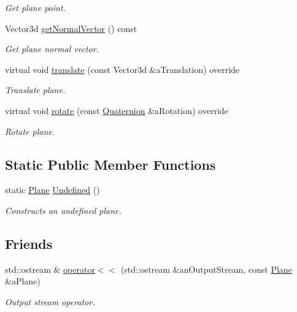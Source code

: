 \begin{DoxyCompactItemize}
\begin{DoxyCompactList}\small\item\em Get plane point. \end{DoxyCompactList}\item 
Vector3d \hyperlink{classlibrary_1_1math_1_1geom_1_1d3_1_1objects_1_1_plane_a9d34608a389d4c80dad6b6f58b82c0e4}{get\+Normal\+Vector} () const
\begin{DoxyCompactList}\small\item\em Get plane normal vector. \end{DoxyCompactList}\item 
virtual void \hyperlink{classlibrary_1_1math_1_1geom_1_1d3_1_1objects_1_1_plane_a58e3829c1a2f96a571eebe0996850984}{translate} (const Vector3d \&a\+Translation) override
\begin{DoxyCompactList}\small\item\em Translate plane. \end{DoxyCompactList}\item 
virtual void \hyperlink{classlibrary_1_1math_1_1geom_1_1d3_1_1objects_1_1_plane_a8dea00fbd8b29b1ac15574601cc1015b}{rotate} (const \hyperlink{classlibrary_1_1math_1_1geom_1_1trf_1_1rot_1_1_quaternion}{Quaternion} \&a\+Rotation) override
\begin{DoxyCompactList}\small\item\em Rotate plane. \end{DoxyCompactList}\end{DoxyCompactItemize}
\subsection*{Static Public Member Functions}
\begin{DoxyCompactItemize}
\item 
static \hyperlink{classlibrary_1_1math_1_1geom_1_1d3_1_1objects_1_1_plane}{Plane} \hyperlink{classlibrary_1_1math_1_1geom_1_1d3_1_1objects_1_1_plane_a27a635007aaccdc55f2c5c12a8264c20}{Undefined} ()
\begin{DoxyCompactList}\small\item\em Constructs an undefined plane. \end{DoxyCompactList}\end{DoxyCompactItemize}
\subsection*{Friends}
\begin{DoxyCompactItemize}
\item 
std\+::ostream \& \hyperlink{classlibrary_1_1math_1_1geom_1_1d3_1_1objects_1_1_plane_a32c25520bfef52e525ce88742a901b26}{operator$<$$<$} (std\+::ostream \&an\+Output\+Stream, const \hyperlink{classlibrary_1_1math_1_1geom_1_1d3_1_1objects_1_1_plane}{Plane} \&a\+Plane)
\begin{DoxyCompactList}\small\item\em Output stream operator. \end{DoxyCompactList}\end{DoxyCompactItemize}


